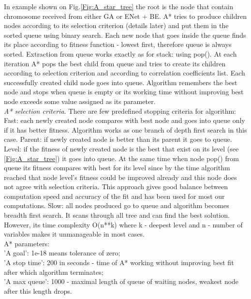 \documentclass[aps,prl,reprint,amsmath,amssymb,nature]{revtex4-1}
\begin{document}
In example shown on Fig.\ref{Fig:A_star_tree} the root is the node that contain chromosome received from either GA or ENet + BE. A* tries to produce children nodes according to its selection criterion (details later) and put them in the sorted queue using binary search. Each new node that goes inside the queue finds its place according to fitness function - lowest first, therefore queue is always sorted. Extraction from queue works exactly as for stack: using pop(). At each iteration A* pops the best child from queue and tries to create its children according to selection criterion and according to correlation coefficients list. Each successfully created child node goes into queue. Algorithm remembers the best node and stops when queue is empty or its working time without improving best node exceeds some value assigned as its parameter.\\
\textit{A* selection criteria.} There are few predefined stopping criteria for algorithm:
Fast: each newly created node compares with best node and goes into queue only if it has better fitness. Algorithm works as one branch of depth first search in this case.
Parent: if newly created node is better than its parent it goes to queue.
Level: if the fitness of newly created node is the best that exist on its level (see \ref{Fig:A_star_tree}) it goes into queue. At the same time when node pop() from queue its fitness compares with best for its level since by the time algorithm reached that node level's fitness could be improved already and this node does not agree with selection criteria. This approach gives good balance between computation speed and accuracy of the fit and has been used for most our computations.
Slow: all nodes produced go to queue and algorithm becomes breadth first search. It scans through all tree and can find the best solution. However, its time complexity O(n**k) where k - deepest level and n - number of variables makes it unmanageable in most cases. \\
A* parameters:\\
'A goal': 1e-18 means tolerance of zero; \\
'A stop time': 200 in seconds - time of A* working without improving best fit after which algorithm terminates;\\
'A max queue': 1000 - maximal length of queue of waiting nodes, weakest node after this length drops.\\

\old
\end{document}
